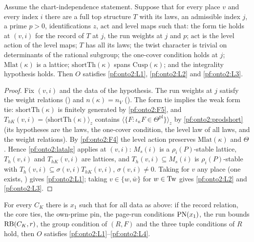 \begin{lemma}\label{pf:onto2:lemmaS}
Assume the chart-independence statement. Suppose that for every place $v$ and every index $i$ there are a full top structure
$T$ with its laws, an admissible index $j$, a prime $p>0$, identifications $z$, $\mathrm{act}$ and level maps such that: the form tie
holds at $(v,i)$ for the record of $T$ at $j$, the run weights at $j$ and $p$; $\mathrm{act}$ is the level action of the level maps;
$T$ has all its laws; the twist character is trivial on determinants of the rational subgroup; the one-cover condition holds at
$j$; $\mathrm{Mlat}(\kappa)$ is a lattice; $\mathrm{shortTh}(\kappa)$ spans $\mathrm{Cusp}(\kappa)$; and the integrality hypothesis
holds. Then $O$ satisfies \ref{pf:onto2:L1}, \ref{pf:onto2:L2} and \ref{pf:onto2:L3}.
\end{lemma}

\begin{proof}
Fix $(v,i)$ and the data of the hypothesis. The run weights at $j$ satisfy the weight relations
() and $n(\kappa)=n_V$ (). The form
tie implies the weak form tie: $\mathrm{shortTh}(\kappa)$ is finitely generated by \ref{pf:onto2:F5}, and $T_{hK}(v,i)=\langle
\mathrm{shortTh}(\kappa)\rangle_z$ contains $\langle\{F:\iota_\kappa F\in\Theta^{\mathrm{pl}}\}\rangle_z$ by \cref{pf:onto2:prodshort}
(its hypotheses are the laws, the one-cover condition, the level law of all laws, and the weight relations). By \ref{pf:onto2:F4}
the level action preserves $\mathrm{Mlat}(\kappa)$ and $\Theta$. Hence \cref{pf:onto2:latalg} applies at $(v,i)$: $M_s(i)$ is a
$\rho_i(P)$-stable lattice, $T_h(v,i)$ and $T_{hK}(v,i)$ are lattices, and $T_h(v,i)\subseteq M_s(i)$ is $\rho_i(P)$-stable with
$T_h(v,i)\subseteq\sigma(v,i)T_{hK}(v,i)$, $\sigma(v,i)\ne0$. Taking for $v$ any place (one exists,
) gives \ref{pf:onto2:L1}; taking $v\in\{w,\bar w\}$ for $w\in\mathrm{Tw}$ gives
\ref{pf:onto2:L2} and \ref{pf:onto2:L3}.
\end{proof}

\begin{proposition}\label{pf:onto2:latleaves}
For every $C_K$ there is $x_1$ such that for all data as above: if the record relation, the core ties, the own-prime pin, the
page-run conditions $\mathrm{PN}(x_1)$, the run bounds $\mathrm{RB}(C_K,r)$, the group condition of $(R,F)$ and the three tuple
conditions of $R$ hold, then $O$ satisfies \ref{pf:onto2:L1}--\ref{pf:onto2:L4}.
\end{proposition}

